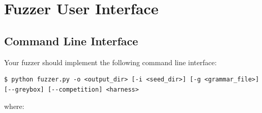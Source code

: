 \documentclass[letterpaper,11pt]{article}
\begin{document}









\section{Fuzzer User Interface}

\subsection{Command Line Interface}

Your fuzzer should implement the following command line interface:

\begin{verbatim}
$ python fuzzer.py -o <output_dir> [-i <seed_dir>] [-g <grammar_file>]
[--greybox] [--competition] <harness>
\end{verbatim}


where:
\end{document}
